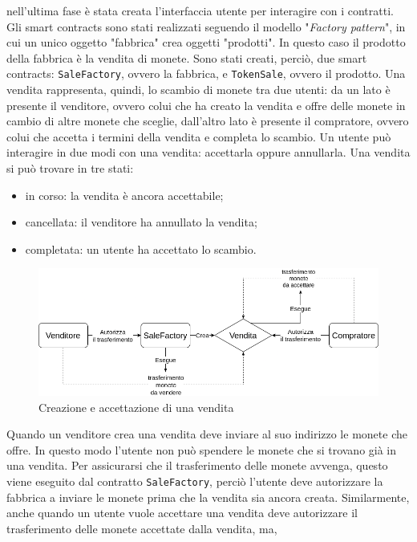 \documentclass[a4paper]{article}
\begin{document}
        nell'ultima fase è stata creata l'interfaccia utente per interagire con i contratti.
        \newline
        Gli smart contracts sono stati realizzati seguendo il modello "\emph{Factory pattern}", in cui un unico oggetto "fabbrica" crea oggetti "prodotti". In questo caso il prodotto della fabbrica è la vendita di monete.
        Sono stati creati, perciò, due smart contracts: \verb|SaleFactory|, ovvero la fabbrica, e \verb|TokenSale|, ovvero il prodotto. Una vendita rappresenta, quindi, lo scambio di monete tra due utenti: da un lato è presente
        il venditore, ovvero colui che ha creato la vendita e offre delle monete in cambio di altre monete che sceglie, dall'altro lato è presente il compratore, ovvero colui che accetta i termini della vendita e completa lo scambio.
        Un utente può interagire in due modi con una vendita: accettarla oppure annullarla. Una vendita si può trovare in tre stati: 
        \begin{itemize}
          \item in corso: la vendita è ancora accettabile;
          \item cancellata: il venditore ha annullato la vendita;
          \item completata: un utente ha accettato lo scambio.
        \end{itemize}
        \begin{figure}[H]
          \includegraphics[scale=0.45, fbox]{saleInteraction.png}
          \centering
          \caption{Creazione e accettazione di una vendita}
          \centering
          \label{fig:saleInteraction}
        \end{figure}
        Quando un venditore crea una vendita deve inviare al suo indirizzo le monete che offre. In questo modo l'utente non può spendere le monete che si trovano già in una vendita. Per assicurarsi che il trasferimento delle monete avvenga, questo viene
        eseguito dal contratto \verb|SaleFactory|, perciò l'utente deve autorizzare la fabbrica a inviare le monete prima che la vendita sia ancora creata. Similarmente, anche quando un utente vuole accettare una vendita deve autorizzare il trasferimento delle monete accettate dalla vendita, ma,
\end{document}
